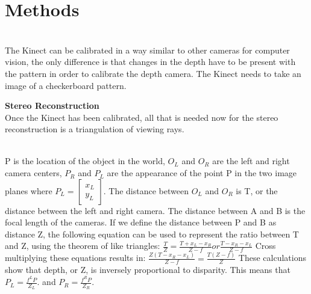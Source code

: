\documentclass[12pt,twocolumn]{article}
\begin{document}
\section{Methods}
\\
The Kinect can be calibrated in a way similar to other cameras for computer vision, the only difference is that changes in the depth have to be present  with the pattern in order to calibrate the depth camera. The Kinect needs to take an image of a checkerboard pattern.

{ \bf Stereo Reconstruction}\\ 
Once the Kinect has been calibrated, all that is needed now for the stereo reconstruction is a triangulation of viewing rays. \\
 \\
\indent P is the location of the object in the world, $O_{L}$ and $O_{R}$ are the left and right camera centers, $P_{R}$ and $P_{L}$ are the appearance of the point P in the two image planes where $P_{L}= \begin{bmatrix}
x_{L} \\
y_{L} \end{bmatrix} $. The distance between $O_{L}$ and $O_{R}$ is T, or the distance between the left and right camera. The distance between A and B is the focal length of the cameras. If we define the distance between P and B as distance Z, the following equation  can be used to represent the ratio between T and Z, using the theorem of like triangles: 
$\frac{T}{Z}=\frac{T+x_{L}-x_{R}}{Z-f} or \frac{T-{x_{R}-x_{L}}}{Z-f} $ 
Cross multiplying these equations results in: 
$\frac{Z(T-x_{R}-x_{L})}{Z-f} = \frac{T(Z-f)}{Z} $ 
These calculations show that depth, or Z, is inversely proportional to disparity. This means that  $P_{L}= \frac{f^{L}P}{Z_{L}}. $ and $P_{R}= \frac{f^{R}P}{Z_{R}}. $ \\ \\
\end{document}
